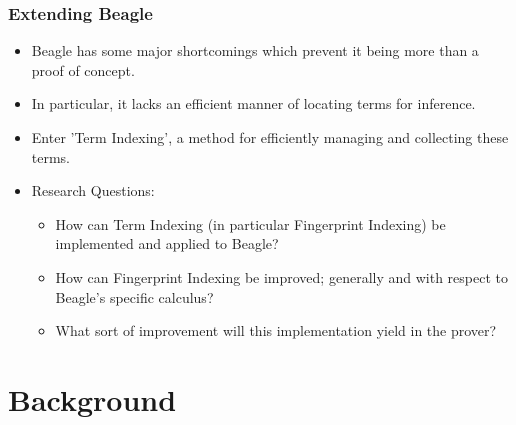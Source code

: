 \documentclass[10pt,xcolor={dvipsnames}]{beamer}
\begin{document}
\begin{NoHyper}
{
\begin{frame}
  \frametitle{Extending Beagle}
  \begin{itemize}
  \item<1-> Beagle has some major shortcomings which prevent it being more than
  a proof of concept.
  \item<1-> In particular, it lacks an efficient manner of locating terms for inference.
  \item<2-> Enter 'Term Indexing', a method for efficiently managing and collecting
  these terms.
  \item<3-> Research Questions:
    \begin{itemize}
    \item<3-> How can Term Indexing (in particular Fingerprint Indexing) be implemented
    and applied to Beagle?
    \item<3-> How can Fingerprint Indexing be improved; generally and with respect to
    Beagle's specific calculus?
    \item<3-> What sort of improvement will this implementation yield in the prover?
    \end{itemize}
  \end{itemize}
\end{frame}
}

\section{Background}


\end{NoHyper}
\end{document}
